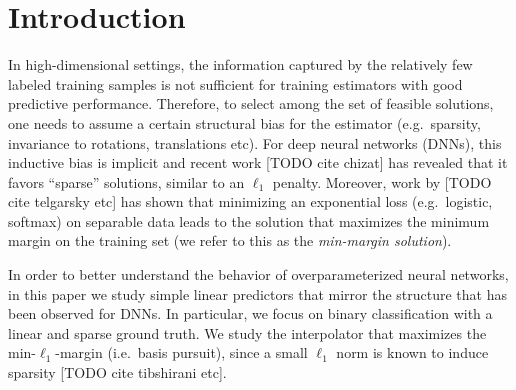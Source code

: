 \section{Introduction}

In high-dimensional settings, the information captured by the relatively few
labeled training samples is not sufficient for training estimators with good
predictive performance. Therefore, to select among the set of feasible
solutions, one needs to assume a certain structural bias for the estimator
(e.g.\ sparsity, invariance to rotations, translations etc).
For deep neural networks (DNNs), this inductive bias is implicit and recent work [TODO
cite chizat] has revealed that it favors ``sparse'' solutions, similar to an
$\ell_1$ penalty. Moreover, work by [TODO cite telgarsky etc] has shown that
minimizing an exponential loss (e.g.\ logistic, softmax) on separable data leads
to the solution that maximizes the minimum margin on the training set (we refer
to this as the \emph{min-margin solution}).

In order to better understand the behavior of overparameterized neural networks,
in this paper we study simple linear predictors that mirror the structure that
has been observed for DNNs. In particular, we focus on binary classification
with a linear and sparse ground truth. We study the interpolator that maximizes
the min-$\ell_1$-margin (i.e.\ basis pursuit), since a small $\ell_1$ norm is
known to induce sparsity [TODO cite tibshirani etc].

